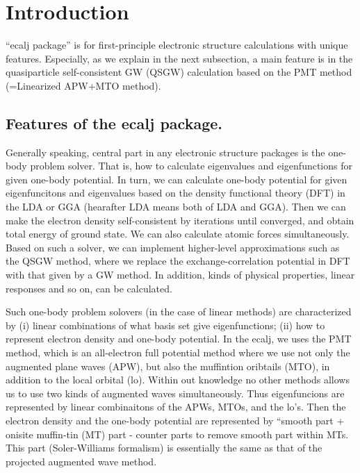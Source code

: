 \documentclass[a4paper,10pt,epsf,fleqn]{article}
\begin{document}
\newcommand{\eps}{\epsilon}
\newcommand{\D}{{\it \Delta}}
\newcommand{\scgw}{QS{\it GW} }

\newcommand{\req}[1]{Eq.(\ref{#1})}
\newcommand{\figss}[2]{\hspace{-3cm}\rotatebox{-90}{\texttt{[image: \#1]}}\rotatebox{-90}{\texttt{[image: \#2]}}}
\newcommand{\figs}[2]{\hspace{-2cm}\rotatebox{0}{\texttt{[image: \#1]}}\rotatebox{0}{\texttt{[image: \#2]}}}



\newpage
\section{Introduction}
``ecalj package'' is for first-principle electronic structure
calculations with unique features. 
Especially, as we explain in the next subsection,
a main feature is in the quasiparticle self-consistent GW (QSGW)
calculation based on the PMT method (=Linearized APW+MTO method).

\subsection{Features of the ecalj package.}
Generally speaking, central part in any electronic structure
packages is the one-body problem solver. 
That is, how to calculate eigenvalues and eigenfunctions for given one-body
potential. In turn, we can calculate one-body potential 
for given eigenfuncitons and eigenvalues
based on the density functional theory (DFT) in the LDA or GGA
(hearafter LDA means both of LDA and GGA).
Then we can make the electron density self-consistent by iterations
until converged, and obtain total energy of ground state.
We can also calculate atomic forces simultaneously.
Based on such a solver, we can implement 
higher-level approximations such as the QSGW method, where we replace
the exchange-correlation potential in DFT with that given by a GW method.
In addition, kinds of physical properties, linear responses and so on, 
can be calculated.

Such one-body problem solovers (in the case of linear methods) are
characterized by (i) linear combinations of what basis set give eigenfunctions; 
(ii) how to represent electron density and one-body potential.
In the ecalj, we uses the PMT method, which is an
all-electron full potential method where we use not only the
augmented plane waves (APW), but also the muffintion oribtails (MTO),
in addition to the local orbital (lo). Within out knowledge no other
methods allows us to use two kinds of augmented waves simultaneously.
Thus eigenfuncions are represented by linear combinaitons of the
APWs, MTOs, and the lo's.
Then the electron density and the one-body potential are represented
by ``smooth part + onisite muffin-tin (MT) part - counter parts to
remove smooth part within MTs.
This part (Soler-Williams formalism) is essentially 
the same as that of the projected augmented wave method.
\end{document}
